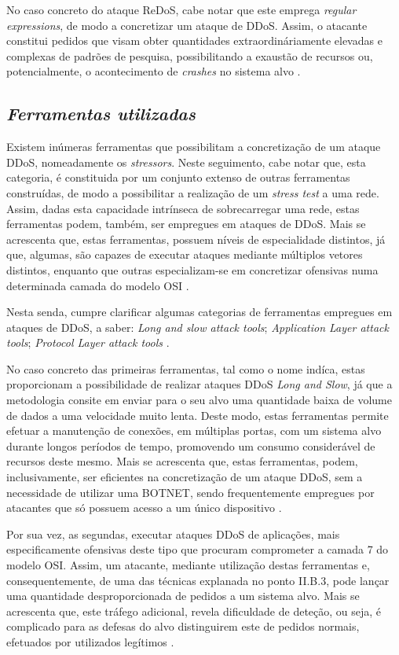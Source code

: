 No caso concreto do ataque ReDoS, cabe notar que este emprega \textit{regular expressions}, de modo a concretizar um ataque de DDoS. Assim, o atacante constitui pedidos que visam obter quantidades extraordináriamente elevadas e complexas de padrões de pesquisa, possibilitando a exaustão de recursos ou, potencialmente, o acontecimento de \textit{crashes} no sistema alvo \cite{esecurityplanet_types_of_ddos_attacks}.


\subsection{\textit{Ferramentas utilizadas}}
Existem inúmeras ferramentas que possibilitam a concretização de um ataque DDoS, nomeadamente os \textit{stressors}. Neste seguimento, cabe notar que, esta categoria, é constituida por um conjunto extenso de outras ferramentas construídas, de modo a possibilitar a realização de um \textit{stress test} a uma rede. Assim, dadas esta capacidade intrínseca de sobrecarregar uma rede, estas ferramentas podem, também, ser empregues em ataques de DDoS. Mais se acrescenta que, estas ferramentas, possuem níveis de especialidade distintos, já que, algumas, são capazes de executar ataques mediante múltiplos vetores distintos, enquanto que outras especializam-se em concretizar ofensivas numa determinada camada do modelo OSI \cite{cloudflare_ddos_tools, radware_attack_tools}.


Nesta senda, cumpre clarificar algumas categorias de ferramentas empregues em ataques de DDoS, a saber: \textit{Long and slow attack tools}; \textit{Application Layer attack tools}; \textit{Protocol Layer attack tools} \cite{cloudflare_ddos_tools}.

No caso concreto das primeiras ferramentas, tal como o nome indíca, estas proporcionam a possibilidade de realizar ataques DDoS \textit{Long and Slow}, já que a metodologia consite em enviar para o seu alvo uma quantidade baixa de volume de dados a uma velocidade muito lenta. Deste modo, estas ferramentas permite efetuar a manutenção de conexões, em múltiplas portas, com um sistema alvo durante longos períodos de tempo, promovendo um consumo considerável de recursos deste mesmo. Mais se acrescenta que, estas ferramentas, podem, inclusivamente, ser eficientes na concretização de um ataque DDoS, sem a necessidade de utilizar uma BOTNET, sendo frequentemente empregues por atacantes que só possuem acesso a um único dispositivo \cite{cloudflare_ddos_tools, radware_attack_tools}.


Por sua vez, as segundas, executar ataques DDoS de aplicações, mais especificamente ofensivas deste tipo que procuram comprometer a camada 7 do modelo OSI. Assim, um atacante, mediante utilização destas ferramentas e, consequentemente, de uma das técnicas explanada no ponto II.B.3, pode lançar uma quantidade desproporcionada de pedidos a um sistema alvo. Mais se acrescenta que, este tráfego adicional, revela dificuldade de deteção, ou seja, é complicado para as defesas do alvo distinguirem este de pedidos normais, efetuados por utilizados legítimos \cite{cloudflare_ddos_tools}.


